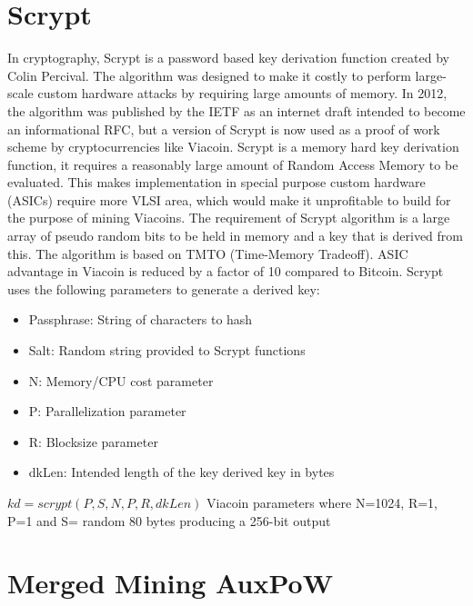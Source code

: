 \documentclass{article}
\begin{document}
\section{Scrypt}\label{sec: Scrypt}
In cryptography, \cite{scrypt}Scrypt is a password based key derivation function created by Colin Percival. The algorithm was designed to make it costly to perform large-scale custom hardware attacks by requiring large amounts of memory. In 2012, the algorithm was published by the IETF as an internet draft intended to become an informational RFC, but a version of Scrypt is now used as a proof of work scheme by cryptocurrencies like Viacoin.
\newline \newline \noindent
Scrypt is a memory hard key derivation function, it requires a reasonably large amount of Random Access Memory to be evaluated.
This makes implementation in special purpose custom hardware (ASICs) require more VLSI area, which would make it unprofitable to build for the purpose of mining Viacoins. The requirement of Scrypt algorithm is a large array of pseudo random bits to be held in memory and a key that is derived from this. The algorithm is based on TMTO (Time-Memory Tradeoff). ASIC advantage in Viacoin is reduced by a factor of 10 compared to Bitcoin.
\newline \newline \noindent
Scrypt uses the following parameters to generate a derived key:
\begin{itemize}
\item Passphrase: String of characters to hash
\item Salt: Random string provided to Scrypt functions
\item N: Memory/CPU cost parameter
\item P: Parallelization parameter
\item R: Blocksize parameter
\item dkLen: Intended length of the key derived key in bytes
\end{itemize}
$kd = scrypt(P, S, N, P, R, dkLen)$
\newline \newline \noindent
Viacoin parameters where N=1024, R=1, P=1 and S= random 80 bytes producing a 256-bit output

\section{Merged Mining AuxPoW}\label{sec:Merged Mining AuxPoW}
\end{document}
